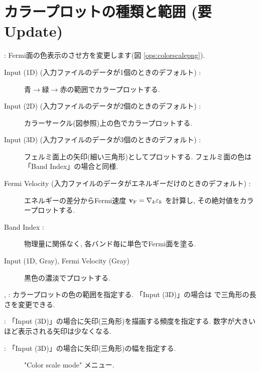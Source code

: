 \documentclass[letterpaper,10pt,dvipdfmx,openany]{sphinxmanual}
\let\sphinxpxdimen\pdfpxdimen\else\newdimen\sphinxpxdimen
\begin{document}
\section{カラープロットの種類と範囲 (要Update)}
\label{\detokenize{ops:update}}
\sphinxAtStartPar
{} : Fermi面の色表示のさせ方を変更します(図 \ref{ops:colorscalepng}).
\begin{description}
\item[{Input (1D) (入力ファイルのデータが1個のときのデフォルト) :}] \leavevmode
\sphinxAtStartPar
青\(\rightarrow\)緑\(\rightarrow\)赤の範囲でカラープロットする.

\item[{Input (2D) (入力ファイルのデータが2個のときのデフォルト) :}] \leavevmode
\sphinxAtStartPar
カラーサークル(図参照)上の色でカラープロットする.

\item[{Input (3D) (入力ファイルのデータが3個のときのデフォルト) :}] \leavevmode
\sphinxAtStartPar
フェルミ面上の矢印(細い三角形)としてプロットする.
フェルミ面の色は「Band Index」の場合と同様.

\item[{Fermi Velocity (入力ファイルのデータがエネルギーだけのときのデフォルト) :}] \leavevmode
\sphinxAtStartPar
エネルギーの差分からFermi速度 \({\bf v}_{\rm F} = \nabla_k \varepsilon_k\)
を計算し, その絶対値をカラープロットする.

\item[{Band Index :}] \leavevmode
\sphinxAtStartPar
物理量に関係なく, 各バンド毎に単色でFermi面を塗る.

\item[{Input (1D, Gray), Fermi Velocity (Gray)}] \leavevmode
\sphinxAtStartPar
黒色の濃淡でプロットする.

\end{description}

\sphinxAtStartPar
{},  : カラープロットの色の範囲を指定する.
「Input (3D)」の場合は  で三角形の長さを変更できる.

\sphinxAtStartPar
{} : 「Input (3D)」の場合に矢印(三角形)を描画する頻度を指定する.
数字が大きいほど表示される矢印は少なくなる.

\sphinxAtStartPar
{} : 「Input (3D)」の場合に矢印(三角形)の幅を指定する.

\begin{figure}[htbp]
\centering
\capstart

\noindent\sphinxincludegraphics[width=700\sphinxpxdimen]{{colorscale}.png}
\caption{"Color scale mode" メニュー.}\label{\detokenize{ops:id27}}\label{\detokenize{ops:colorscalepng}}\end{figure}
\end{document}
